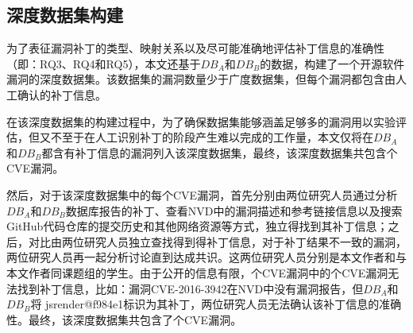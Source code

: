\subsection{深度数据集构建}
为了表征漏洞补丁的类型、映射关系以及尽可能准确地评估补丁信息的准确性（即：RQ3、RQ4和RQ5），本文还基于$DB_A$和$DB_B$的数据，构建了一个开源软件漏洞的深度数据集。该数据集的漏洞数量少于广度数据集，但每个漏洞都包含由人工确认的补丁信息。%

在该深度数据集的构建过程中，为了确保数据集能够涵盖足够多的漏洞用以实验评估，但又不至于在人工识别补丁的阶段产生难以完成的工作量，本文仅将在$DB_A$和$DB_B$都含有补丁信息的漏洞列入该深度数据集，最终，该深度数据集共包含个CVE漏洞。

然后，对于该深度数据集中的每个CVE漏洞，首先分别由两位研究人员通过分析$DB_A$和$DB_B$数据库报告的补丁、查看NVD中的漏洞描述和参考链接信息以及搜索GitHub代码仓库的提交历史和其他网络资源等方式，独立得找到其补丁信息；之后，对比由两位研究人员独立查找得到得补丁信息，对于补丁结果不一致的漏洞，两位研究人员再一起分析讨论直到达成共识。这两位研究人员分别是本文作者和与本文作者同课题组的学生。由于公开的信息有限，个CVE漏洞中的个CVE漏洞无法找到补丁信息，比如：漏洞CVE-2016-3942在NVD中没有漏洞报告，但$DB_A$和$DB_B$将 jsrender@f984e1\cite{jsrender}标识为其补丁，两位研究人员无法确认该补丁信息的准确性。最终，该深度数据集共包含了个CVE漏洞。


